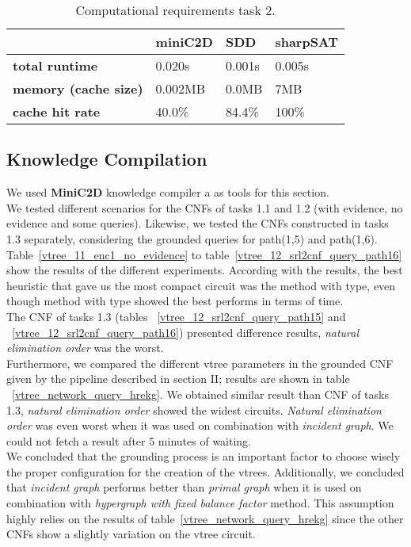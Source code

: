 \begin{table}[h]
	\centering
	\caption{Computational requirements task 2.}
	\label{table:comptask2}
	\begin{tabular}{l|l|l|l}
		\textbf{}        & \textbf{miniC2D} & \textbf{SDD} & \textbf{sharpSAT} \\ \hline
		\textbf{total runtime} &  0.020s  &   0.001s   &   0.005s  \\ \hline
		\textbf{memory (cache size)}  &  0.002MB  &   0.0MB &   7MB  \\ \hline
		\textbf{cache hit rate}  & 40.0\%  & 84.4\% &   100\%
	\end{tabular}
\end{table}

\subsection{Knowledge Compilation}\label{subsec:knowledgecompilation}

We used \textbf{MiniC2D} knowledge compiler a as tools for this section.
\\[2ex]
We tested different scenarios for the CNFs of tasks 1.1 and 1.2 (with evidence, no evidence and some queries). Likewise, we tested the CNFs constructed in tasks 1.3 separately, considering the grounded queries for path(1,5) and path(1,6).
\\[2ex]
Table~\ref{vtree_11_enc1_no_evidence} to table~\ref{vtree_12_srl2cnf_query_path16} show the results of the different experiments. According with the results, the best heuristic that gave us the most compact circuit was the  method with  type, even though  method with  type showed the best performs in terms of time.
\\[2ex]
The CNF of tasks 1.3 (tables ~\ref{vtree_12_srl2cnf_query_path15} and ~\ref{vtree_12_srl2cnf_query_path16}) presented difference results, \textit{natural elimination order} was the worst.
\\[2ex]
Furthermore, we compared the different vtree parameters in the grounded CNF given by the pipeline described in section II; results are shown in table ~\ref{vtree_network_query_hrekg}. We obtained similar result than CNF of tasks 1.3, \textit{natural elimination order} showed the widest circuits. \textit{Natural elimination order} was even worst when it was used on combination with \textit{incident graph}. We could not fetch a result after 5 minutes of waiting.
\\[2ex]
We concluded that the grounding process is an important factor to choose wisely the proper configuration for the creation of the vtrees. Additionally, we concluded that \textit{incident graph} performs better than \textit{primal graph} when it is used on combination with \textit{hypergraph with fixed balance factor} method. This assumption highly relies on the results of table~\ref{vtree_network_query_hrekg} since the other CNFs show a slightly variation on the vtree circuit.
\\[2ex]

